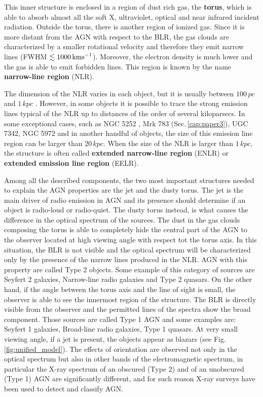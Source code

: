 \documentclass[../thesis.tex]{subfiles}
\begin{document}
This inner structure is enclosed in a region of dust rich gas, the \textbf{torus}, which is able to absorb almost all the soft X, ultraviolet, optical and near infrared incident radiation.
Outside the torus, there is another region of ionized gas.
Since it is more distant from the AGN with respect to the BLR, the gas clouds are characterized by a smaller rotational velocity and therefore they emit narrow lines (FWHM $\lesssim 1000\,\si{\kms}$).
Moreover, the electron density is much lower and the gas is able to emit forbidden lines.
This region is known by the name \textbf{narrow-line region} (NLR).

The dimension of the NLR varies in each object, but it is usually between $100\,\si{pc}$ and $1\,\si{kpc}$ \citep{Beckmann12}.
However, in some objects it is possible to trace the strong emission lines typical of the NLR up to distances of the order of several kiloparsecs.
In some exceptional cases, such as NGC 5252 \citep{Tadhunter89}, Mrk 783 (Sec.\,\ref{cap:paper3}), UGC 7342, NGC 5972 \citep{Keel12} and in another handful of objects, the size of this emission line region can be larger than $20\,\si{kpc}$.
When the size of the NLR is larger than $1\,\si{kpc}$, the structure is often called \textbf{extended narrow-line region} (ENLR) or \textbf{extended emission line region} (EELR).

Among all the described components, the two most important structures needed to explain the AGN properties are the jet and the dusty torus.
The jet is the main driver of radio emission in AGN and its presence should determine if an object is radio-loud or radio-quiet.
The dusty torus instead, is what causes the difference in the optical spectrum of the sources.
The dust in the gas clouds composing the torus is able to completely hide the central part of the AGN to the observer located at high viewing angle with respect tot the torus axis.
In this situation, the BLR is not visible and the optical spectrum will be characterized only by the presence of the narrow lines produced in the NLR.
AGN with this property are called Type 2 objects.
Some example of this category of sources are Seyfert 2 galaxies, Narrow-line radio galaxies and Type 2 quasars.
On the other hand, if the angle between the torus axis and the line of sight is small, the observer is able to see the innermost region of the structure.
The BLR is directly visible from the observer and the permitted lines of the spectra show the broad component.
Those sources are called Type 1 AGN and some examples are: Seyfert 1 galaxies, Broad-line radio galaxies, Type 1 quasars.
At very small viewing angle, if a jet is present, the objects appear as blazars (see Fig.\,\ref{fig:unified_model}).
The effects of orientation are observed not only in the optical spectrum but also in other bands of the electromagnetic spectrum, in particular the X-ray spectrum of an obscured (Type 2) and of an unobscured (Type 1) AGN are significantly different, and for such reason X-ray surveys have been used to detect and classify AGN. 
\end{document}
